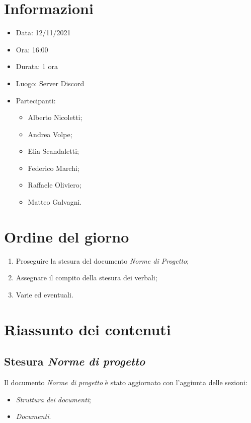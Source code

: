 \documentclass[a4paper, 12pt]{article}
\begin{document}
\makefrontpage

\section{Informazioni}

\begin{itemize}
\item Data: 12/11/2021
\item Ora: 16:00
\item Durata: 1 ora
\item Luogo: Server Discord
\item Partecipanti: 
\begin{itemize}
\item Alberto Nicoletti;
\item Andrea Volpe;
\item Elia Scandaletti;
\item Federico Marchi;
\item Raffaele Oliviero;
\item Matteo Galvagni.
\end{itemize}
\end{itemize}

\section{Ordine del giorno}
\begin{enumerate}
    \item Proseguire la stesura del documento \textit{Norme di Progetto};
    \item Assegnare il compito della stesura dei verbali;
    \item Varie ed eventuali.
\end{enumerate}

\section{Riassunto dei contenuti}


\subsection{Stesura \textit{Norme di progetto}} 
Il documento \textit{Norme di progetto} è stato aggiornato con l'aggiunta delle sezioni:
\begin{itemize}
    \item \textit{Struttura dei documenti};
    \item \textit{Documenti}.
\end{itemize}
\end{document}
